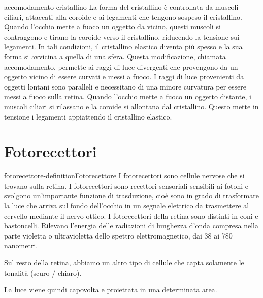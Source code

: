 \documentclass[preview]{standalone}
\begin{document}
\begin{snippet}{accomodamento-cristallino}
    La forma del cristallino è controllata da muscoli ciliari, attaccati alla coroide e ai legamenti
che tengono sospeso il cristallino. Quando l'occhio mette a fuoco un oggetto da vicino,
questi muscoli si contraggono e tirano la coroide verso il cristallino, riducendo la tensione
sui legamenti. In tali condizioni, il cristallino elastico diventa più spesso e la sua forma si
avvicina a quella di una sfera. Questa modificazione, chiamata accomodamento, permette
ai raggi di luce divergenti che provengono da un oggetto vicino di essere curvati e messi a
fuoco. I raggi di luce provenienti da oggetti lontani sono paralleli e necessitano di una minore
curvatura per essere messi a fuoco sulla retina. Quando l'occhio mette a fuoco un oggetto
distante, i muscoli ciliari si rilassano e la coroide si allontana dal cristallino. Questo mette in
tensione i legamenti appiattendo il cristallino elastico.
\end{snippet}

\section{Fotorecettori}

\begin{snippetdefinition}{fotorecettore-definition}{Fotorecettore}
    I fotorecettori sono cellule nervose che si trovano sulla retina. I fotorecettori sono recettori
    sensoriali sensibili ai fotoni e svolgono un'importante funzione di trasduzione, cioè sono in
    grado di trasformare la luce che arriva sul fondo dell'occhio in un segnale elettrico da
    trasmettere al cervello mediante il nervo ottico. I fotorecettori della retina sono distinti in coni
    e bastoncelli. Rilevano l'energia delle radiazioni di lunghezza d'onda compresa nella parte
    violetta o ultravioletta dello spettro elettromagnetico, dai 38 ai 780 nanometri.
\end{snippetdefinition}

\begin{plainhtml}
    Sul resto della retina, abbiamo un altro tipo di cellule che capta solamente le tonalità (scuro / chiaro).
\end{plainhtml}

\begin{plainhtml}
    La luce viene quindi capovolta e proiettata in una determinata area.
\end{plainhtml}

\end{document}
